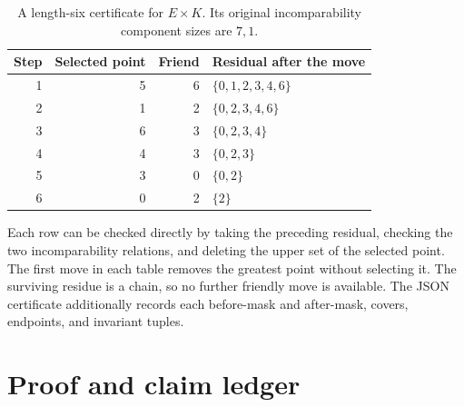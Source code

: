 \documentclass[11pt,letterpaper]{article}
\theoremstyle{definition}
\theoremstyle{remark}
\begin{document}
\begin{table}[ht]
\centering
\begin{tabular}{@{}rrrl@{}}
\toprule
Step & Selected point & Friend & Residual after the move\\
\midrule
1 & 5 & 6 & $\{0,1,2,3,4,6\}$\\
2 & 1 & 2 & $\{0,2,3,4,6\}$\\
3 & 6 & 3 & $\{0,2,3,4\}$\\
4 & 4 & 3 & $\{0,2,3\}$\\
5 & 3 & 0 & $\{0,2\}$\\
6 & 0 & 2 & $\{2\}$\\
\bottomrule
\end{tabular}
\caption{A length-six certificate for $E\times K$. Its original
incomparability component sizes are $7,1$.}
\end{table}

Each row can be checked directly by taking the preceding residual,
checking the two incomparability relations, and deleting the upper set of
the selected point. The first move in each table removes the greatest
point without selecting it. The surviving residue is a chain, so no
further friendly move is available. The JSON certificate additionally
records each before-mask and after-mask, covers, endpoints, and invariant
tuples.

\clearpage
\section{Proof and claim ledger}\label{app:ledger}
\end{document}
